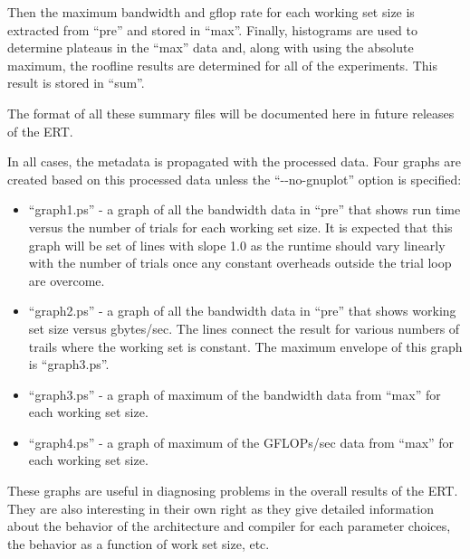 Then the maximum bandwidth and gflop rate for each working set size is
extracted from ``pre'' and stored in ``max''.  Finally, histograms are used to
determine plateaus in the ``max'' data and, along with using the absolute
maximum, the roofline results are determined for all of the experiments.
This result is stored in ``sum''.

The format of all these summary files will be documented here in future
releases of the ERT.

In all cases, the metadata is propagated with the processed data.  Four graphs
are created based on this processed data
unless the ``-{}-no-gnuplot'' option is specified:

\begin{itemize}

\vspace{-0.1in}
\item{``graph1.ps'' - a graph of all the bandwidth data in ``pre'' that shows
run time versus the number of trials for each working set size.  It is
expected that this graph will be set of lines with slope 1.0 as the runtime
should vary linearly with the number of trials once any constant overheads
outside the trial loop are overcome.}

\vspace{-0.1in}
\item{``graph2.ps'' - a graph of all the bandwidth data in ``pre'' that shows
working set size versus gbytes/sec.  The lines connect the result for various
numbers of trails where the working set is constant. The maximum envelope of
this graph is ``graph3.ps''.}

\vspace{-0.1in}
\item{``graph3.ps'' - a graph of maximum of the bandwidth data from ``max''
for each working set size.}

\vspace{-0.1in}
\item{``graph4.ps'' - a graph of maximum of the GFLOPs/sec data from ``max''
for each working set size.}

\end{itemize}

These graphs are useful in diagnosing problems in the overall results of the
ERT.  They are also interesting in their own right as they give detailed
information about the behavior of the architecture and compiler for each
parameter choices, the behavior as a function of work set size, etc.

